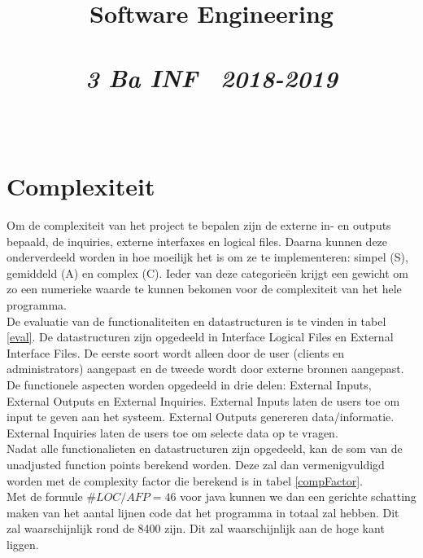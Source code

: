 \documentclass{article}
\title{\textmd{\textbf{Software Engineering}}\\\normalsize\vspace{0.1in}\Large{\assignmentname}\\\vspace{0.1in}\small{\textit{3 Ba INF \  2018-2019}}}
\author{\studentA \\ \studentB}
\begin{document}
\maketitle
\section{Complexiteit}
Om de complexiteit van het project te bepalen zijn de externe in- en outputs bepaald, de inquiries, externe interfaxes en logical files. Daarna kunnen deze onderverdeeld worden in hoe moeilijk het is om ze te implementeren: simpel (S), gemiddeld (A) en complex (C). Ieder van deze categorie\"en krijgt een gewicht om zo een numerieke waarde te kunnen bekomen voor de complexiteit van het hele programma.\\
De evaluatie van de functionaliteiten en datastructuren is te vinden in tabel \ref{eval}. De datastructuren zijn opgedeeld in Interface Logical Files en External Interface Files. De eerste soort wordt alleen door de user (clients en administrators) aangepast en de tweede wordt door externe bronnen aangepast. De functionele aspecten worden opgedeeld in drie delen: External Inputs, External Outputs en External Inquiries. External Inputs laten de users toe om input te geven aan het systeem. External Outputs genereren data/informatie. External Inquiries laten de users toe om selecte data op te vragen.\\
Nadat alle functionalieten en datastructuren zijn opgedeeld, kan de som van de unadjusted function points berekend worden. Deze zal dan vermenigvuldigd worden met de complexity factor die berekend is in tabel \ref{compFactor}.\\
Met de formule $\#LOC/AFP = 46$ voor java kunnen we dan een gerichte schatting maken van het aantal lijnen code dat het programma in totaal zal hebben. Dit zal waarschijnlijk rond de 8400 zijn. Dit zal waarschijnlijk aan de hoge kant liggen.\\
\end{document}
